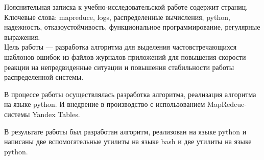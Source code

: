 Пояснительная записка к учебно-исследовательской работе содержит
\pageref{LastPage} страниц.\\

Ключевые слова: mapreduce, logs, распределенные вычисления, python, надежность,
отказоустойчивость, функциональное программирование, регулярные выражения.\\

Цель работы --- разработка алгоритма для выделения частовстречающихся шаблонов
ошибок из файлов журналов приложений для повышения скорости реакции
на непредвиденные ситуации и повышения стабильности работы распределенной
системы.

В процессе работы осуществлялась разработка алгоритма, реализация алгоритма на
языке python. И внедрение в производство с использованием MapRedcue-системы
Yandex Tables.

В результате работы был разработан алгоритм, реализован на языке
python и написаны две вспомогательные утилиты на языке bash и две утилиты
на языке python.
